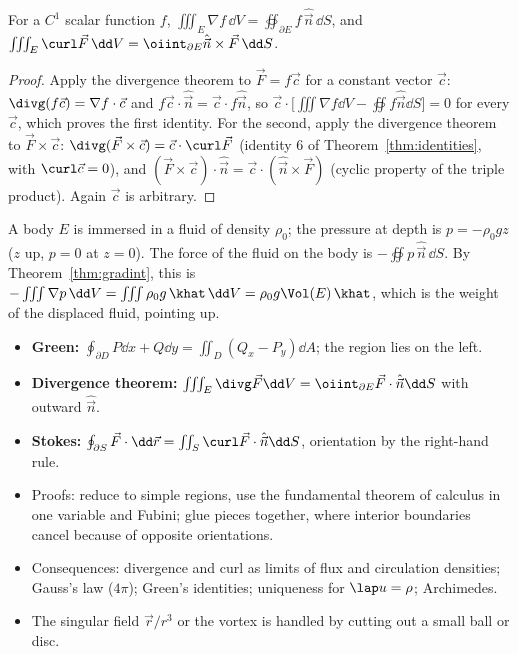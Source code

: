 \begin{theorem}\label{thm:gradint}
For a $C^1$ scalar function $f$, $\iiint_E\nabla f\,\dd V=\oiint_{\partial E}f\,\hat{\vec n}\,\dd S$, and $\iiint_E\curl\vec F\,\dd V=\oiint_{\partial E}\hat{\vec n}\times\vec F\,\dd S$.
\end{theorem}

\begin{proof}
Apply the divergence theorem to $\vec F=f\vec c$ for a constant vector $\vec c$: $\divg(f\vec c)=\nabla f\cdot\vec c$ and $f\vec c\cdot\hat{\vec n}=\vec c\cdot f\hat{\vec n}$, so $\vec c\cdot\bigl[\iiint\nabla f\dd V-\oiint f\hat{\vec n}\dd S\bigr]=0$ for every $\vec c$, which proves the first identity. For the second, apply the divergence theorem to $\vec F\times\vec c$: $\divg(\vec F\times\vec c)=\vec c\cdot\curl\vec F$ (identity 6 of Theorem~\ref{thm:identities}, with $\curl\vec c=0$), and $(\vec F\times\vec c)\cdot\hat{\vec n}=\vec c\cdot(\hat{\vec n}\times\vec F)$ (cyclic property of the triple product). Again $\vec c$ is arbitrary.
\end{proof}

\begin{example}
A body $E$ is immersed in a fluid of density $\rho_0$; the pressure at depth is $p=-\rho_0gz$ ($z$ up, $p=0$ at $z=0$). The force of the fluid on the body is $-\oiint p\,\hat{\vec n}\,\dd S$. By Theorem~\ref{thm:gradint}, this is $-\iiint\nabla p\,\dd V=\iiint\rho_0g\,\khat\,\dd V=\rho_0g\Vol(E)\,\khat$, which is the weight of the displaced fluid, pointing up.
\end{example}

\begin{summarybox}
\begin{itemize}
  \item \textbf{Green:} $\oint_{\partial D}P\dd x+Q\dd y=\iint_D(Q_x-P_y)\dd A$; the region lies on the left.
  \item \textbf{Divergence theorem:} $\iiint_E\divg\vec F\dd V=\oiint_{\partial E}\vec F\cdot\hat{\vec n}\dd S$ with outward $\hat{\vec n}$.
  \item \textbf{Stokes:} $\oint_{\partial S}\vec F\cdot\dd\vec r=\iint_S\curl\vec F\cdot\hat{\vec n}\dd S$, orientation by the right-hand rule.
  \item Proofs: reduce to simple regions, use the fundamental theorem of calculus in one variable and Fubini; glue pieces together, where interior boundaries cancel because of opposite orientations.
  \item Consequences: divergence and curl as limits of flux and circulation densities; Gauss's law ($4\pi$); Green's identities; uniqueness for $\lap u=\rho$; Archimedes.
  \item The singular field $\vec r/r^3$ or the vortex is handled by cutting out a small ball or disc.
\end{itemize}
\end{summarybox}

